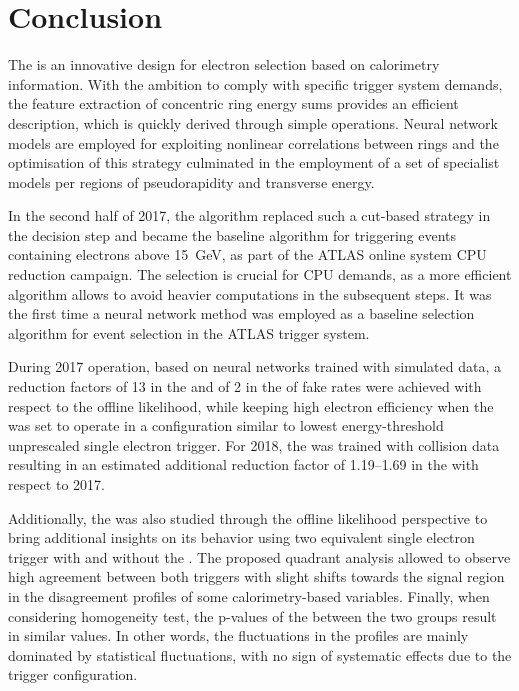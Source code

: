 \section{Conclusion}\label{sec:conclusion}


The \rnn{} is an innovative design for electron selection based on
calorimetry information. With the
ambition to comply with specific trigger system demands, the feature extraction
of concentric ring energy sums provides an efficient description, which is quickly derived through simple operations. Neural network models are employed for exploiting
nonlinear correlations between rings and the optimisation of this strategy culminated in the employment of a set of specialist models per regions of pseudorapidity and transverse energy. 


In the second half of 2017, the \rnn{} algorithm replaced such a cut-based strategy
in the \fastcalo{} decision step and became the baseline algorithm
for triggering events containing electrons above \SI{15}{\GeV}, as part of the ATLAS online system CPU reduction campaign. The \fastcalo{} selection is crucial for CPU demands, as a more
efficient algorithm allows to avoid heavier computations in the
subsequent steps.  It was the first time a neural network method was employed as
a baseline selection algorithm for event selection in the ATLAS trigger system.


During 2017 operation, based on neural networks trained with simulated data, a
reduction factors of 13 in the \fastcalo{} and of 2 in
the \hlt{} of fake rates were achieved with respect to the offline likelihood, while
keeping high electron efficiency when the \rnn{} was set to operate in a
configuration similar to lowest energy-threshold unprescaled single electron
trigger. For 2018, the \rnn{} was trained with collision
data resulting in an estimated additional reduction factor of 1.19--1.69 in the  \fastcalo{} with respect to 2017. 


Additionally, the \rnn{} was also studied through the offline likelihood perspective to bring additional insights on its behavior using two equivalent single electron trigger with and without the \rnn{}.
The proposed quadrant analysis
allowed to observe high agreement between both triggers with slight shifts
towards the signal region in the disagreement profiles of some calorimetry-based
variables. Finally, when considering homogeneity test, the p-values of the between the two groups result in similar values. In other words, the fluctuations in the profiles are mainly dominated by statistical fluctuations, with no sign of systematic effects due to the trigger configuration.




